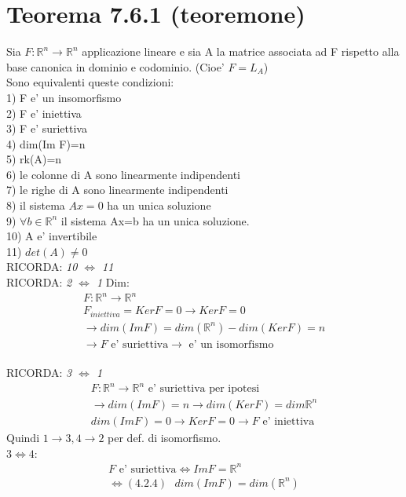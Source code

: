 \documentclass[a4paper,12pt]{article}
\begin{document}
\section{Teorema 7.6.1 (teoremone)}
Sia $F: \mathbb{R}^n \to \mathbb{R}^n$ applicazione lineare e sia A la matrice associata ad F rispetto alla base canonica in dominio e codominio.  (Cioe' $F=L_A$) 
\\Sono equivalenti queste condizioni:
\\1) F e' un insomorfismo
\\2) F e' iniettiva
\\3) F e' suriettiva
\\4) dim(Im F)=n
\\5) rk(A)=n
\\6) le colonne di A sono linearmente indipendenti
\\7) le righe di A sono linearmente indipendenti
\\8) il sistema $Ax=0$ ha un unica soluzione
\\9) $\forall b \in \mathbb{R}^n$ il sistema Ax=b ha un unica soluzione.
\\10) A e' invertibile
\\11) $det(A) \neq 0$
\\RICORDA: \textit{10 $\iff$ 11}
\\RICORDA: \textit{2 $\iff$ 1}
Dim: 
\begin{align*}
    F : \mathbb{R}^n \to \mathbb{R}^n \\
    F_{iniettiva}=Ker F = {0}  \to Ker F =0
    \\ \to dim(Im F)=dim(\mathbb{R}^n)-dim(Ker F)=n
    \\ \to F \text{ e' suriettiva} \to \text{ e' un isomorfismo}
\end{align*}
\\RICORDA: \textit{3 $\iff $ 1}
\begin{align*}
    F : \mathbb{R}^n \to \mathbb{R}^n \text{ e' suriettiva per ipotesi}\\ 
    \to dim(Im F)=n \to dim(Ker F)=dim \mathbb{R}^n
    \\ dim(Im F)=0 \to Ker F = {0} \to F \text{ e' iniettiva}
\end{align*}
Quindi $1 \to 3, 4 \to 2$ per def. di isomorfismo.
\\ $3 \iff 4$:
\begin{align*}
    F \text{ e' suriettiva} \iff Im F = \mathbb{R}^n
    \\ \iff (4.2.4) \text{  }dim(Im F)=dim(\mathbb{R}^n)
\end{align*}
\end{document}
